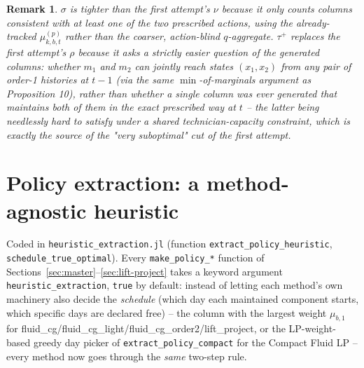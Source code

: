 \documentclass[11pt]{article}
\newtheorem{remark}{Remark}
\begin{document}
\begin{remark}
$\sigma$ is tighter than the first attempt's $\nu$ because it only counts columns
consistent with \emph{at least one} of the two prescribed actions, using the
already-tracked $\mu^{(p)}_{k,b,t}$ rather than the coarser, action-blind $q$-aggregate.
$\tau^+$ replaces the first attempt's $\rho$ because it asks a strictly easier question of
the generated columns: whether $m_1$ and $m_2$ can \emph{jointly reach} states
$(x_1,x_2)$ from \emph{any} pair of order-1 histories at $t-1$ (via the same
$\min$-of-marginals argument as Proposition 10), rather than whether a single column was
ever generated that maintains both of them in the exact prescribed way at $t$ -- the
latter being needlessly hard to satisfy under a shared technician-capacity constraint,
which is exactly the source of the "very suboptimal" cut of the first attempt.
\end{remark}

\section{Policy extraction: a method-agnostic heuristic}
\label{sec:heuristic-extraction}

Coded in \texttt{heuristic\_extraction.jl} (function \texttt{extract\_policy\_heuristic},
\texttt{schedule\_true\_optimal}). Every \texttt{make\_policy\_*} function of
Sections~\ref{sec:master}--\ref{sec:lift-project} takes a keyword argument
\texttt{heuristic\_extraction}, \texttt{true} by default: instead of letting each method's
own machinery also decide the \emph{schedule} (which day each maintained component starts,
which specific days are declared free) -- the column with the largest weight
$\mu_{b,1}$ for fluid\_cg/fluid\_cg\_light/fluid\_cg\_order2/lift\_project, or the
LP-weight-based greedy day picker of \texttt{extract\_policy\_compact} for the Compact Fluid
LP -- every method now goes through the \emph{same} two-step rule.
\end{document}

